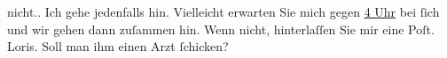 \begin{ledgroupsized}[t]{13cm}
{{{                  nicht.}}}\label{K_L00049_1h}. Ich gehe jedenfalls hin.\pend
           \pstart
           Vielleicht erwarten Sie mich gegen \uline{4 Uhr} bei ſich und
               wir gehen dann zuſammen hin.\pend
           \pstart
           Wenn nicht, hinterlaſſen Sie mir eine Poſt.\pend
           \pstart \spacefill\mbox{Loris.}\pend{}\pstart
           \noindent{}Soll man ihm einen Arzt ſchicken?\pend
           \endnumbering{}\end{ledgroupsized}  \newcommand{\dateiname}{L00049}\newcommand{\titel}{Hugo von Hofmannsthal an Arthur Schnitzler, [6. 12. 1891]}\newcommand{\editorInnen}{ Martin Anton Müller, Gerd-Hermann Susen und Gerd-Hermann Susen}
            \footnotesize
\begin{ledgroupsized}[t]{11.5cm}
\end{ledgroupsized}
         
      